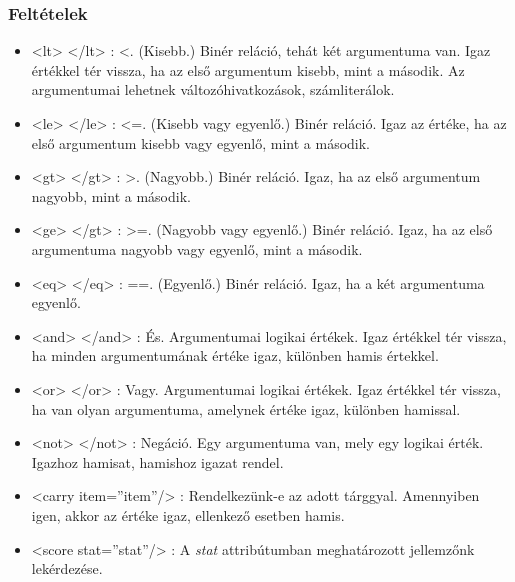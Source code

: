 \documentclass[12pt,a4paper,oneside]{report}
\newcommand{\attr}{\emph}
\begin{document}
      \subsubsection{Feltételek}
        \begin{itemize}
          \item <{\color{Tag}lt}> <{\color{Tag}/lt}> : <. (Kisebb.) Binér
            reláció, tehát két argumentuma van. Igaz értékkel tér vissza,
            ha az első argumentum kisebb, mint a második. Az argumentumai
            lehetnek változóhivatkozások, számliterálok.
            
          \item <{\color{Tag}le}> <{\color{Tag}/le}> : <=. (Kisebb vagy
            egyenlő.) Binér reláció. Igaz az értéke, ha az első argumentum
            kisebb vagy egyenlő, mint a második.
            
          \item <{\color{Tag}gt}> <{\color{Tag}/gt}> : >. (Nagyobb.) Binér
            reláció. Igaz, ha az első argumentum nagyobb, mint a második.
            
          \item <{\color{Tag}ge}> <{\color{Tag}/gt}> : >=. (Nagyobb vagy
            egyenlő.) Binér reláció. Igaz, ha az első argumentuma nagyobb
            vagy egyenlő, mint a második.
            
          \item <{\color{Tag}eq}> <{\color{Tag}/eq}> : ==. (Egyenlő.)
            Binér reláció. Igaz, ha a két argumentuma egyenlő.
            
          \item <{\color{Tag}and}> <{\color{Tag}/and}> : És. Argumentumai
            logikai értékek. Igaz értékkel tér vissza, ha minden
            argumentumának értéke igaz, különben hamis értekkel.
            
          \item <{\color{Tag}or}> <{\color{Tag}/or}> : Vagy. Argumentumai
            logikai értékek. Igaz értékkel tér vissza, ha van olyan
            argumentuma, amelynek értéke igaz, különben hamissal.
            
          \item <{\color{Tag}not}> <{\color{Tag}/not}> : Negáció. Egy
            argumentuma van, mely egy logikai érték. Igazhoz hamisat,
            hamishoz igazat rendel.
          \item <{\color{Tag}carry}
            {\color{Attr}item}={\color{Value}''item''}/> : Rendelkezünk-e az
            adott tárggyal. Amennyiben igen, akkor az értéke igaz,
            ellenkező esetben hamis.
            
          \item <{\color{Tag}score}
            {\color{Attr}stat}={\color{Value}''stat''}/> : A \attr{stat}
            attribútumban meghatározott jellemzőnk lekérdezése.
        \end{itemize}
\end{document}
